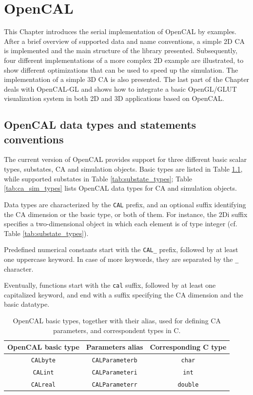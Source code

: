 \chapter{OpenCAL}\label{ch:opencal}

This Chapter introduces the serial implementation of OpenCAL by
examples. After a brief overview of supported data and name
conventions, a simple 2D CA is implemented and the main structure of
the library presented. Subsequently, four different implementations of
a more complex 2D example are illustrated, to show different
optimizations that can be used to speed up the simulation. The
implementation of a simple 3D CA is also presented. The last part of
the Chapter deals with OpenCAL-GL and shows how to integrate a basic
OpenGL/GLUT visualization system in both 2D and 3D applications based
on OpenCAL.


\section{OpenCAL data types and statements conventions}\label{sec:Conventions}

The current version of OpenCAL provides support for three different
basic scalar types, substates, CA and simulation objects. Basic types
are listed in Table \ref{tab:basic_types}, while supported substates
in Table \ref{tab:substate_types}; Table \ref{tab:ca_sim_types} lists
OpenCAL data types for CA and simulation objects.

Data types are characterized by the \verb'CAL' prefix, and an optional
suffix identifying the CA dimension or the basic type, or both of
them. For instance, the 2Di suffix specifies a two-dimensional object
in which each element is of type integer (cf. Table
\ref{tab:substate_types}).

Predefined numerical constants start with the \verb'CAL_' prefix,
followed by at least one uppercase keyword. In case of more keywords,
they are separated by the \verb'_' character.

Eventually, functions start with the \verb'cal' suffix, followed by at
least one capitalized keyword, and end with a suffix specifying the CA
dimension and the basic datatype.

\begin{table}
  \centering
  \begin{tabular}{ccc}
    \hline
    OpenCAL basic type & Parameters alias & Corresponding C type \\
    \hline
    \verb'CALbyte' & \verb'CALParameterb' & \verb'char'  \\
    \verb'CALint'  & \verb'CALParameteri' & \verb'int'  \\
    \verb'CALreal' & \verb'CALParameterr' & \verb'double'  \\
    \hline
  \end{tabular}
  \caption{OpenCAL basic types, together with their alias, used for
    defining CA parameters, and correspondent types in C.}
  \label{tab:basic_types}
\end{table}

